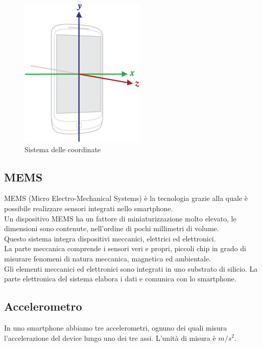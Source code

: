 \documentclass[12pt,a4paper,openright,twoside]{report}
\begin{document}
\begin{figure}[h] 
\centering 
\includegraphics[scale=0.8]{fig2} 
\caption{Sistema delle coordinate} 
\end{figure}

\subsection{MEMS}
MEMS (Micro Electro-Mechanical Systems) è la tecnologia grazie alla quale è possibile realizzare sensori integrati nello smartphone.\\
Un dispositivo MEMS ha un fattore di miniaturizzazione molto elevato, le dimensioni sono contenute, nell'ordine di pochi millimetri di volume.\\
Questo sistema integra dispositivi meccanici, elettrici ed elettronici.\\
La parte meccanica comprende i sensori veri e propri, piccoli chip in grado di misurare fenomeni di natura meccanica, magnetica ed ambientale.\\
Gli elementi meccanici ed elettronici sono integrati in uno substrato di silicio. La parte elettronica del sistema elabora i dati e comunica con lo smartphone. \cite{K14}

\subsection{Accelerometro}
In uno smartphone abbiamo tre accelerometri, ognuno dei quali misura l'accelerazione del device lungo uno dei tre assi. L'unità di misura è $m/s^2$.
\end{document}
